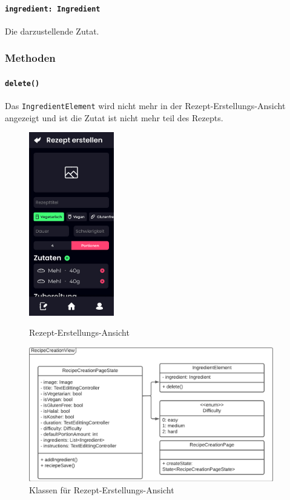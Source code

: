 \documentclass{entwurfsheft}
\begin{document}
                \paragraph*{\texttt{ingredient: Ingredient}} Die darzustellende Zutat.

            \subsubsection*{Methoden}
                \paragraph*{\texttt{delete()}} Das \texttt{IngredientElement} wird nicht mehr in der Rezept-Erstellungs-Ansicht angezeigt und ist die Zutat ist nicht mehr teil des Rezepts.

        \begin{figure}[htp]
                \begin{minipage}
                    [t]{0.49\textwidth}
                    \centering
                    \includegraphics[height=80mm]{images/Presentation-layer/RecipeCreationView.jpg}
                    \caption{Rezept-Erstellungs-Ansicht}
                \end{minipage}
                \begin{minipage}
                    [t]{0.49\textwidth}
                    \centering
                    \includegraphics[width=0.95\textwidth]{images/Presentation-layer/RecipeCreationViewClass.pdf}
                    \caption{Klassen für Rezept-Erstellungs-Ansicht}
                \end{minipage}
        \end{figure}
\end{document}
